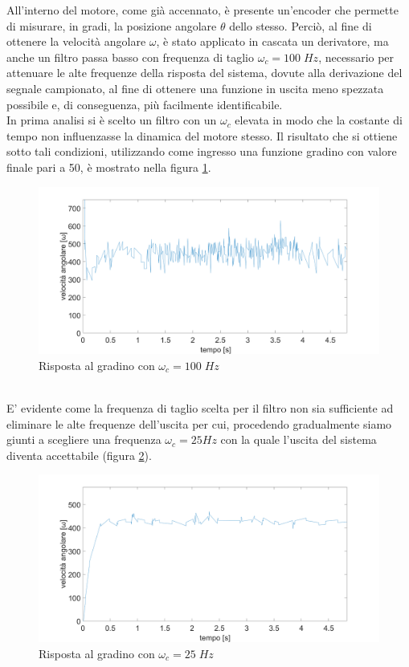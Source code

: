 All'interno del motore, come già accennato, è presente un'encoder che permette di misurare, in gradi, la posizione angolare $\theta$ dello stesso.
Perciò, al fine di ottenere la velocità angolare $\omega$, è stato applicato in cascata un derivatore, ma anche un filtro passa basso con frequenza di taglio $\omega_c=100\;Hz$, necessario per attenuare le alte frequenze della risposta del sistema, dovute alla derivazione del segnale campionato, al fine di ottenere una funzione in uscita meno spezzata possibile e, di conseguenza, più facilmente identificabile.\\
In prima analisi si è scelto un filtro con un $\omega_c$ elevata in modo che la costante di tempo non influenzasse la dinamica del motore stesso.
Il risultato che si ottiene sotto tali condizioni, utilizzando come ingresso una funzione gradino con valore finale pari a 50, è mostrato nella figura \ref{motore50StepCamp1000Polo100}.
\begin{figure}[ht]
	\centering
	\includegraphics[width=\textwidth]{motore50StepCamp1000Polo100.png}
	\caption{Risposta al gradino con $\omega_c=100\;Hz$ }
	\label{motore50StepCamp1000Polo100}
\end{figure}
\\E' evidente come la frequenza di taglio scelta per il filtro non sia sufficiente ad eliminare le alte frequenze dell'uscita per cui, procedendo gradualmente siamo giunti a  scegliere una frequenza $\omega_c = 25Hz$ con la quale l'uscita del sistema diventa accettabile (figura \ref{motore50StepCamp1000}).
\begin{figure}[ht]
\centering
\includegraphics[width=\textwidth]{motore50StepCamp1000.png}
\caption{Risposta al gradino con $\omega_c=25\;Hz$}
\label{motore50StepCamp1000}
\end{figure}
